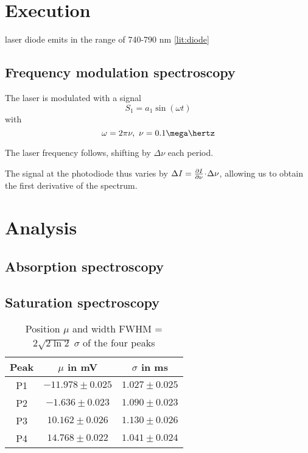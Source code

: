 
\section{Execution} %

laser diode emits in the range of 740-790 nm \ref{lit:diode}

\subsection{Frequency modulation spectroscopy}
The laser is modulated with a signal
\begin{equation}
 S_1 = a_1 \sin(\omega t)
\end{equation}
with
\begin{equation}
 \omega = 2 \pi \nu,~ \nu = 0.1 \mega\hertz
\end{equation}

The laser frequency follows, shifting by $\Delta \nu$ each period.

The signal at the photodiode thus varies by $\Delta I = \frac{\partial I}{\partial\nu} \!\cdot\! \Delta \nu$, allowing us to obtain the first derivative of the spectrum.


\section{Analysis}
\subsection{Absorption spectroscopy}

\subsection{Saturation spectroscopy}


\begin{table}
 \centering
 \caption{Position $\mu$ and width FWHM = $2 \sqrt{2 \ln 2} \; \sigma$ of the four peaks}
 \label{tab:raw}
 \begin{tabular}{ccc}
  \toprule
  Peak	& $\mu$ in mV 		& $\sigma$ in ms \\
  \midrule
  P1	& $-11.978 \pm 0.025$	& $1.027 \pm 0.025$ \\
  P2	& $-1.636 \pm 0.023$	& $1.090 \pm 0.023$ \\
  P3	& $10.162 \pm 0.026$	& $1.130 \pm 0.026$ \\
  P4	& $14.768 \pm 0.022$	& $1.041 \pm 0.024$ \\
  \bottomrule
 \end{tabular}
\end{table}

